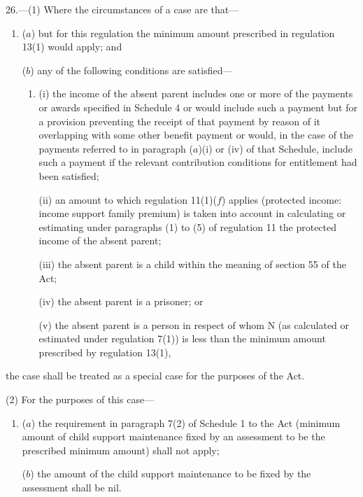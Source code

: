 \documentclass[12pt,a4paper]{article}
\begin{document}
26.—(1) Where the circumstances of a case are that—
\begin{enumerate}\item[]
($a$) but for this regulation the minimum amount prescribed in regulation 13(1) would apply; and

($b$) any of the following conditions are satisfied—
\begin{enumerate}\item[]
(i) the income of the absent parent includes one or more of the payments or awards specified in Schedule 4 or would include such a payment but for a provision preventing the receipt of that payment by reason of it overlapping with some other benefit payment or would, in the case of the payments referred to in paragraph ($a$)(i) or (iv) of that Schedule, include such a payment if the relevant contribution conditions for entitlement had been satisfied;

(ii) an amount to which regulation 
11(1)($f$)  %
applies (protected income: income support family premium) is taken into account in calculating or estimating 
under paragraphs (1) to (5) of regulation 11  %
the protected income of the absent parent;

(iii) the absent parent is a child within the meaning of section 55 of the Act;

(iv) the absent parent is a prisoner; or

(v) the absent parent is a person in respect of whom N (as calculated or estimated under regulation 7(1)) is less than the minimum amount prescribed by regulation 13(1),
\end{enumerate}
\end{enumerate}
the case shall be treated as a special case for the purposes of the Act.

(2) For the purposes of this case—
\begin{enumerate}\item[]
($a$) the requirement in paragraph 7(2) of Schedule 1 to the Act (minimum amount of child support maintenance fixed by an assessment to be the prescribed minimum amount) shall not apply;

($b$) the amount of the child support maintenance to be fixed by the assessment shall be nil.
\end{enumerate}

\end{document}
